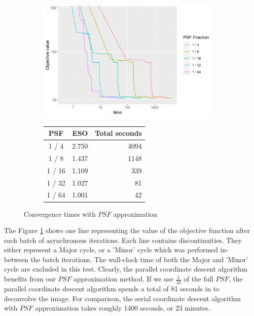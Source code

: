 \begin{figure}[h]
	\centering
	\begin{subfigure}{0.6\linewidth}
		\includegraphics[width=1.0\linewidth]{./chapters/10.results/pcdm/psfSize.png}
	\end{subfigure}
	\begin{subfigure}{0.35\linewidth}
		\begin{tabular}{c | r | r}
			PSF & ESO & Total seconds \\ \hline
			1 / 4 & 2.750 & 4094 \\
			1 / 8 & 1.437 & 1148 \\
			1 / 16 & 1.109 & 339 \\
			1 / 32 & 1.027 & 81 \\
			1 / 64 & 1.001 & 42 \\
		\end{tabular}
	\end{subfigure}
	\caption{Convergence times with $PSF$ approximation}
	\label{pcdm:results:psf}
\end{figure}

The Figure \ref{pcdm:results:psf} shows one line representing the value of the objective function after each batch of asynchronous iterations. Each line contains discontinuities. They either represent a Major cycle, or a 'Minor' cycle which was performed in-between the batch iterations. The wall-clock time of both the Major and 'Minor' cycle are excluded in this test. Clearly, the parallel coordinate descent algorithm benefits from our $PSF$ approximation method. If we use $\frac{1}{32}$ of the full $PSF$, the parallel coordinate descent algorithm spends a total of 81 seconds in to deconvolve the image. For comparison, the serial coordinate descent algorithm with $PSF$ approximation takes roughly 1400 seconds, or 23 minutes.

